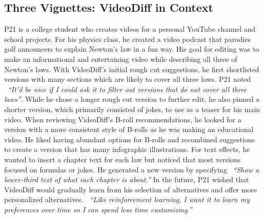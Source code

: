 \subsection{Three Vignettes: VideoDiff in Context}
P21 is a college student who creates videos for a personal YouTube channel and school projects. For his physics class, he created a video podcast that parodies golf announcers to explain Newton's law in a fun way. His goal for editing was to make an informational and entertaining video while describing all three of Newton's laws. With VideoDiff's initial rough cut suggestions, he first shortlisted versions with many sections which are likely to cover all three laws. P21 noted ~\textit{``It'd be nice if I could ask it to filter out versions that do not cover all three laws''}. While he chose a longer rough cut version to further edit, he also pinned a shorter version, which primarily consisted of jokes, to use as a teaser for his main video.
When reviewing VideoDiff's B-roll recommendations, he looked for a version with a more consistent style of B-rolls as he was making an educational video. He liked having abundant options for B-rolls and recombined suggestions to create a version that has many infographic illustrations. 
For text effects, he wanted to insert a chapter text for each law but noticed that most versions focused on formulas or jokes. He generated a new version by specifying ~\textit{``Show a lower-third text of what each chapter is about.''}
In the future, P21 wished that VideoDiff would gradually learn from his selection of alternatives and offer more personalized alternatives. ~\textit{``Like reinforcement learning, I want it to learn my preferences over time so I can spend less time customizing.''}





